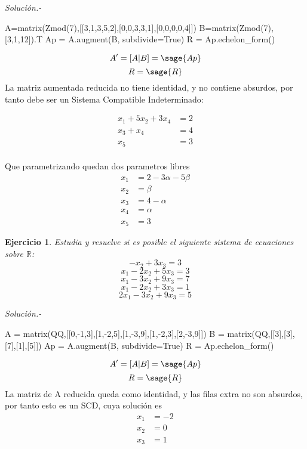 \documentclass{amsart}
\newtheorem{ejer}{Ejercicio}
\def\r{\mathbb{R}}
\begin{document}
{\it Soluci\'on.-}


\begin{sageblock}
A=matrix(Zmod(7),[[3,1,3,5,2],[0,0,3,3,1],[0,0,0,0,4]])
B=matrix(Zmod(7),[3,1,12]).T
Ap = A.augment(B, subdivide=True)
R = Ap.echelon_form()
\end{sageblock}

$$
	A' = [A|B] = \sage{Ap}
$$
$$
	R = \sage{R}
$$
La matriz aumentada reducida no tiene identidad, y no contiene absurdos, por tanto debe ser un Sistema Compatible Indeterminado:

\begin{align*}
	x_1 + 5 x_2 + 3 x_4 &= 2 \\
	x_3 + x_4 &= 4 \\
	x_5 &= 3 \\ 
\end{align*}

Que parametrizando quedan dos parametros libres
\begin{align*}
	x_1 &= 2 - 3 \alpha - 5 \beta \\
	x_2 &= \beta \\
	x_3 &= 4 - \alpha \\
	x_4 &= \alpha \\
	x_5 &= 3
\end{align*}


\begin{ejer} Estudia y resuelve si es posible el siguiente sistema de ecuaciones sobre $\r $:
\[ -x_{2} + 3 x_{3} = 3 \]
\[ x_{1} - 2 x_{2} + 5 x_{3} = 3 \]
\[ x_{1} - 3 x_{2} + 9 x_{3} = 7 \]
\[ x_{1} - 2 x_{2} + 3 x_{3} = 1 \]
\[ 2 x_{1} - 3 x_{2} + 9 x_{3} = 5 \]
\end{ejer}

{\it Soluci\'on.-}

\begin{sageblock}
A = matrix(QQ,[[0,-1,3],[1,-2,5],[1,-3,9],[1,-2,3],[2,-3,9]])
B = matrix(QQ,[[3],[3],[7],[1],[5]])
Ap = A.augment(B, subdivide=True)
R = Ap.echelon_form()
\end{sageblock}

$$
	A' = [A|B] = \sage{Ap}
$$
$$
	R = \sage{R}
$$
La matriz de A reducida queda como identidad, y las filas extra no son absurdos, por tanto esto es un SCD, cuya solución es
\begin{align*}
	x_1 &= -2 \\
	x_2 &= 0 \\
	x_3 &= 1 \\
\end{align*}
\end{document}
